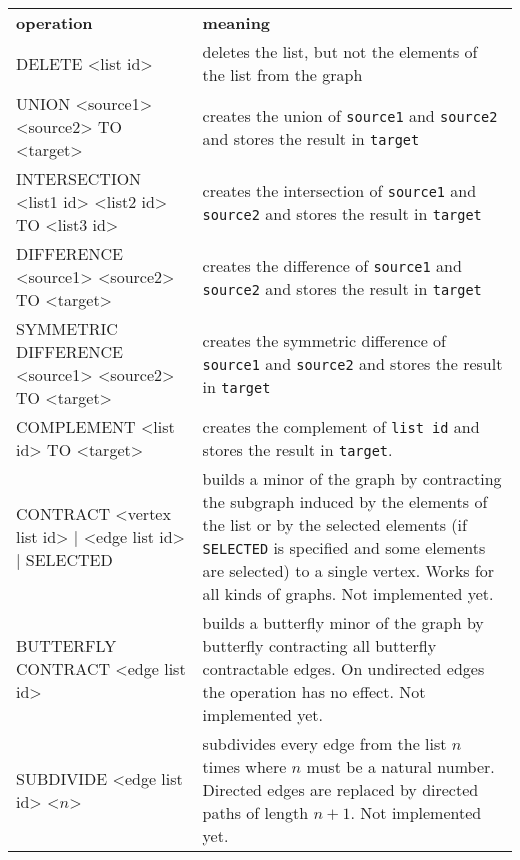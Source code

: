 \begin{tcolorbox}[colback=lightpink]
  \begin{tabular}[H]{p{7cm}|p{8cm}}
    \textbf{operation}    & \textbf{meaning}\\
    DELETE <list id> & deletes the list, but not the elements of the list from the graph\\

    UNION <source1> <source2> TO <target> & creates the union of \texttt{source1} and \texttt{source2} and stores the result in \texttt{target}\\

    INTERSECTION <list1 id> <list2 id> TO <list3 id> &creates the intersection of \texttt{source1} and \texttt{source2} and stores the result in \texttt{target}\\
    
    DIFFERENCE <source1> <source2> TO <target> & creates the difference of \texttt{source1} and \texttt{source2} and stores the result in \texttt{target}\\
    
    SYMMETRIC DIFFERENCE <source1> <source2> TO <target>  & creates the symmetric difference of \texttt{source1} and \texttt{source2} and stores the result in \texttt{target}\\
    
    COMPLEMENT <list id> TO <target>  & creates the complement of \texttt{list id} and stores the result in \texttt{target}.\\
    
    CONTRACT <vertex list id> | <edge list id> | SELECTED & builds a minor of the graph by contracting the subgraph induced by the elements of the list or by the selected elements (if \texttt{SELECTED} is specified and some elements are selected) to a single vertex. Works for all kinds of graphs. Not implemented yet.\\
    BUTTERFLY CONTRACT <edge list id> & builds a butterfly minor of the graph by butterfly contracting all butterfly contractable edges. On undirected edges the operation has no effect. Not implemented yet.\\

    SUBDIVIDE <edge list id> <$n$> & subdivides every edge from the list $n$ times where $n$ must be a natural number. Directed edges are replaced by directed paths of length $n+1$. Not implemented yet.
  \end{tabular}
\end{tcolorbox}

